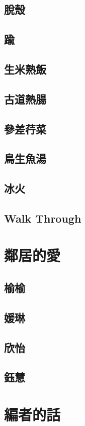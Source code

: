 \documentclass[hyperref]{ctexbook}
\begin{document}
\chapter{脫殼}
\chapter{踰}
\chapter{生米熟飯}
\chapter{古道熱腸}
\chapter{參差荇菜}
\chapter{鳥生魚湯}
\chapter{冰火}
\chapter{Walk Through}

\part{鄰居的愛}
\chapter{榆榆}
\chapter{媛琳}
\chapter{欣怡}
\chapter{鈺慧}

\part{編者的話}

\end{document}
